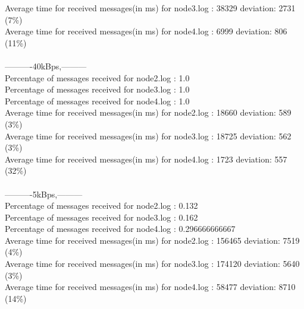         Average time for received messages(in ms) for  node3.log : 38329    deviation: 2731 (7\%)\\
        Average time for received messages(in ms) for  node4.log : 6999     deviation: 806 (11\%)\\\\
        ----------40kBps,---------\\
        Percentage of messages received for node2.log : 1.0\\
        Percentage of messages received for node3.log : 1.0\\
        Percentage of messages received for node4.log : 1.0\\
        Average time for received messages(in ms) for  node2.log : 18660    deviation: 589 (3\%)\\
        Average time for received messages(in ms) for  node3.log : 18725    deviation: 562 (3\%)\\
        Average time for received messages(in ms) for  node4.log : 1723     deviation: 557 (32\%)\\\\
        ----------5kBps,---------\\
        Percentage of messages received for node2.log : 0.132\\
        Percentage of messages received for node3.log : 0.162\\
        Percentage of messages received for node4.log : 0.296666666667\\
        Average time for received messages(in ms) for  node2.log : 156465   deviation: 7519 (4\%)\\
        Average time for received messages(in ms) for  node3.log : 174120   deviation: 5640 (3\%)\\
        Average time for received messages(in ms) for  node4.log : 58477    deviation: 8710 (14\%)\\\\
